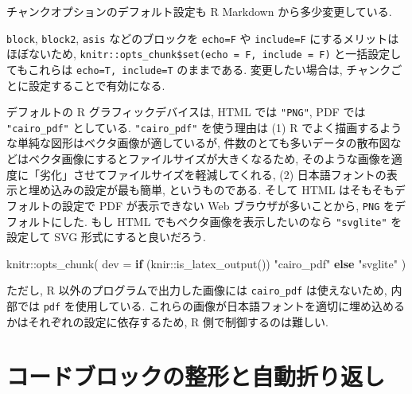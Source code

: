 \documentclass[
]{bxjsbook}
\newenvironment{Shaded}{\begin{snugshade}}{\end{snugshade}}
\newcommand{\AttributeTok}[1]{\textcolor[rgb]{0.77,0.63,0.00}{#1}}
\newcommand{\ControlFlowTok}[1]{\textcolor[rgb]{0.13,0.29,0.53}{\textbf{#1}}}
\newcommand{\FunctionTok}[1]{\textcolor[rgb]{0.00,0.00,0.00}{#1}}
\newcommand{\NormalTok}[1]{#1}
\newcommand{\SpecialCharTok}[1]{\textcolor[rgb]{0.00,0.00,0.00}{#1}}
\newcommand{\StringTok}[1]{\textcolor[rgb]{0.31,0.60,0.02}{#1}}
\theoremstyle{definition}
\theoremstyle{definition}
\theoremstyle{definition}
\theoremstyle{remark}
\begin{document}
チャンクオプションのデフォルト設定も R Markdown から多少変更している.

\texttt{block}, \texttt{block2}, \texttt{asis} などのブロックを
\texttt{echo=F} や \texttt{include=F} にするメリットはほぼないため,
\texttt{knitr::opts\_chunk\$set(echo\ =\ F,\ include\ =\ F)}
と一括設定してもこれらは \texttt{echo=T,\ include=T} のままである.
変更したい場合は, チャンクごとに設定することで有効になる.

デフォルトの R グラフィックデバイスは, HTML では \texttt{"PNG"}, PDF
では \texttt{"cairo\_pdf"} としている. \texttt{"cairo\_pdf"}
を使う理由は (1) R
でよく描画するような単純な図形はベクタ画像が適しているが,
件数のとても多いデータの散布図などはベクタ画像にするとファイルサイズが大きくなるため,
そのような画像を適度に「劣化」させてファイルサイズを軽減してくれる, (2)
日本語フォントの表示と埋め込みの設定が最も簡単, というものである. そして
HTML はそもそもデフォルトの設定で PDF が表示できない Web
ブラウザが多いことから, \texttt{PNG} をデフォルトにした. もし HTML
でもベクタ画像を表示したいのなら \texttt{"svglite"} を設定して SVG
形式にすると良いだろう.

\begin{Shaded}
\begin{Highlighting}[numbers=left,,]
\NormalTok{knitr}\SpecialCharTok{::}\FunctionTok{opts\_chunk}\NormalTok{(}
  \AttributeTok{dev =} \ControlFlowTok{if}\NormalTok{ (knir}\SpecialCharTok{::}\FunctionTok{is\_latex\_output}\NormalTok{()) }\StringTok{"cairo\_pdf"} \ControlFlowTok{else} \StringTok{"svglite"}
\NormalTok{)}
\end{Highlighting}
\end{Shaded}

ただし, R 以外のプログラムで出力した画像には \texttt{cairo\_pdf}
は使えないため, 内部では \texttt{pdf} を使用している.
これらの画像が日本語フォントを適切に埋め込めるかはそれぞれの設定に依存するため,
R 側で制御するのは難しい.

\hypertarget{autoformatter}{%
\section{コードブロックの整形と自動折り返し}\label{autoformatter}}
\end{document}
